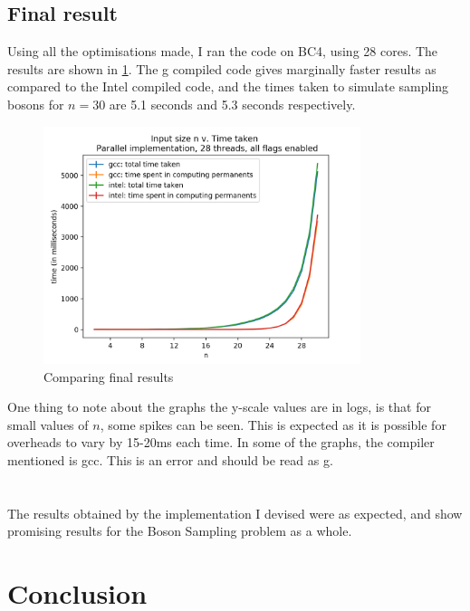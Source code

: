 \documentclass[ %
                    author={Manan Vaswani},
                supervisor={Dr. Raphael Clifford},
                    degree={MEng},
                     title={A multi-core CPU implementation of the classical Boson Sampling algorithm},
                  subtitle={},
                      type={},
                      year={2019} ]{dissertation}
\theoremstyle{plain}
\theoremstyle{definition}
\begin{document}
\section{Final result}
Using all the optimisations made, I ran the code on BC4, using 28 cores. The results are shown in \ref{fig:final_graph}. The g\textt{++} compiled code gives marginally faster results as compared to the Intel compiled code, and the times taken to simulate sampling bosons for $n=30$ are 5.1 seconds and 5.3 seconds respectively.
\begin{figure}
	\centering
  \includegraphics[width=25em]{Graphs/fastest_linear.png}
  \caption{Comparing final results}
  \label{fig:final_graph}
\end{figure}

One thing to note about the graphs the y-scale values are in logs, is that for small values of $n$, some spikes can be seen. This is expected as it is possible for overheads to vary by 15-20ms each time. In some of the graphs, the compiler mentioned is gcc. This is an error and should be read as g\textt{++}.
\\
\\
\\
The results obtained by the implementation I devised were as expected, and show promising results for the Boson Sampling problem as a whole.

\chapter{Conclusion}
\label{chap:conclusion}
\end{document}
